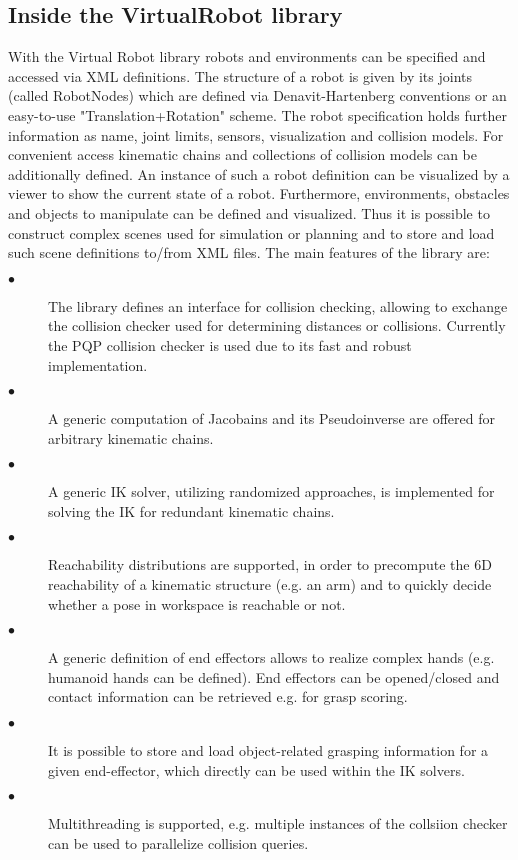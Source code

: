 \subsection{Inside the VirtualRobot library}
With the Virtual Robot library robots and environments can be specified and accessed via XML definitions. The structure of a robot is given by its joints (called RobotNodes) which are defined via Denavit-Hartenberg conventions or an easy-to-use "Translation+Rotation" scheme. The robot specification holds further information as name, joint limits, sensors, visualization and collision models. For convenient access kinematic chains and collections of collision models can be additionally defined. An instance of such a robot definition can be visualized by a viewer to show the current state of a robot. Furthermore, environments, obstacles and objects to manipulate can be defined and visualized. Thus it is possible to construct complex scenes used for simulation or planning and to store and load such scene definitions to/from XML files. The main features of the library are:
\begin{description}
  \item[$\bullet$ ]The library defines an interface for collision checking, allowing to exchange the collision checker used for determining distances or collisions. Currently the PQP collision checker is used due to its fast and robust implementation.
  \item[$\bullet$ ] A generic computation of Jacobains and its Pseudoinverse are offered for arbitrary kinematic chains.
   \item[$\bullet$ ] A generic IK solver, utilizing randomized approaches, is implemented for solving the IK for redundant kinematic chains.
   \item[$\bullet$ ]Reachability distributions are supported, in order to precompute the 6D reachability of a kinematic structure (e.g. an arm) and to quickly decide whether a pose in workspace is reachable or not.
   \item[$\bullet$ ]A generic definition of end effectors allows to realize complex hands (e.g. humanoid hands can be defined). End effectors can be opened/closed and contact information can be retrieved e.g. for grasp scoring.
   \item[$\bullet$ ]It is possible to store and load object-related grasping information for a given end-effector, which directly can be used within the IK solvers.
   \item[$\bullet$ ]Multithreading is supported, e.g. multiple instances of the collsiion checker can be used to parallelize collision queries. 
\end{description}
